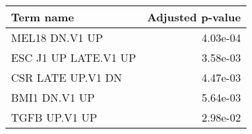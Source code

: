 \begin{tabular}{lr}
\toprule
            Term name &  Adjusted p-value \\
\midrule
       MEL18 DN.V1 UP &          4.03e-04 \\
 ESC J1 UP LATE.V1 UP &          3.58e-03 \\
    CSR LATE UP.V1 DN &          4.47e-03 \\
        BMI1 DN.V1 UP &          5.64e-03 \\
        TGFB UP.V1 UP &          2.98e-02 \\
\bottomrule
\end{tabular}
